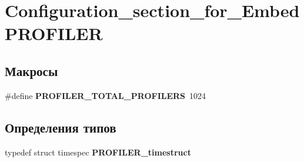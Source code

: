 \hypertarget{group___configuration__section__for___embed_p_r_o_f_i_l_e_r}{\section{\-Configuration\-\_\-section\-\_\-for\-\_\-\-Embed\-P\-R\-O\-F\-I\-L\-E\-R}
\label{group___configuration__section__for___embed_p_r_o_f_i_l_e_r}
}
\subsection*{Макросы}
\begin{DoxyCompactItemize}
\item 
\hypertarget{group___configuration__section__for___embed_p_r_o_f_i_l_e_r_ga775939d541e95ea75e6e7066a1cc6bcb}{\#define {\bfseries \-P\-R\-O\-F\-I\-L\-E\-R\-\_\-\-T\-O\-T\-A\-L\-\_\-\-P\-R\-O\-F\-I\-L\-E\-R\-S}~1024}\label{group___configuration__section__for___embed_p_r_o_f_i_l_e_r_ga775939d541e95ea75e6e7066a1cc6bcb}

\end{DoxyCompactItemize}
\subsection*{Определения типов}
\begin{DoxyCompactItemize}
\item 
\hypertarget{group___configuration__section__for___embed_p_r_o_f_i_l_e_r_gae02193769f3b21a09fc0d5035e566a75}{typedef struct timespec {\bfseries \-P\-R\-O\-F\-I\-L\-E\-R\-\_\-timestruct}}\label{group___configuration__section__for___embed_p_r_o_f_i_l_e_r_gae02193769f3b21a09fc0d5035e566a75}

\end{DoxyCompactItemize}
